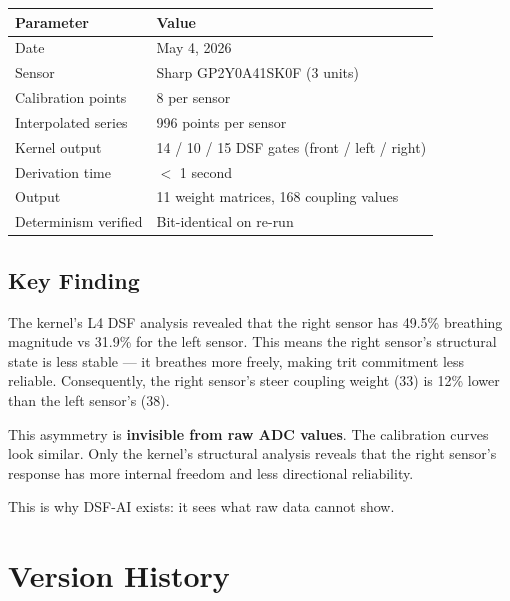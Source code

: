 \documentclass[11pt,a4paper]{article}
\begin{document}
\begin{center}
\begin{tabular}{@{}ll@{}}
\toprule
\textbf{Parameter} & \textbf{Value} \\
\midrule
Date & May 4, 2026 \\
Sensor & Sharp GP2Y0A41SK0F (3 units) \\
Calibration points & 8 per sensor \\
Interpolated series & 996 points per sensor \\
Kernel output & 14 / 10 / 15 DSF gates (front / left / right) \\
Derivation time & $<$ 1 second \\
Output & 11 weight matrices, 168 coupling values \\
Determinism verified & Bit-identical on re-run \\
\bottomrule
\end{tabular}
\end{center}

\subsection{Key Finding}

The kernel's L4 DSF analysis revealed that the right sensor has
49.5\% breathing magnitude vs 31.9\% for the left sensor. This
means the right sensor's structural state is less stable ---
it breathes more freely, making trit commitment less reliable.
Consequently, the right sensor's steer coupling weight (33) is
12\% lower than the left sensor's (38).

This asymmetry is \textbf{invisible from raw ADC values}. The
calibration curves look similar. Only the kernel's structural
analysis reveals that the right sensor's response has more
internal freedom and less directional reliability.

This is why DSF-AI exists: it sees what raw data cannot show.

\section{Version History}
\end{document}
